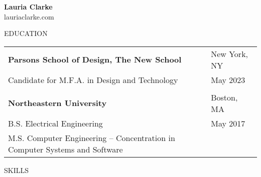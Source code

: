 \documentclass[11pt]{article}
\begin{document}
\thispagestyle{empty}

\begin{center}
  {\LARGE{\bf Lauria Clarke}}
  \vspace{0.25cm} \\
  lauriaclarke.com 
\end{center}

\hrulefill 

EDUCATION

\vspace{0.25cm}
\begin{tabularx}{\textwidth}{l R}
{\bf Parsons School of Design, The New School} & New York, NY\\ 
Candidate for M.F.A. in Design and Technology & May 2023 \\
\\ 
{\bf Northeastern University} & Boston, MA\\ 
B.S. Electrical Engineering & May 2017 \\
M.S. Computer Engineering -- Concentration in Computer Systems and Software\\
\end{tabularx}  
\vspace{-.2cm}

\hrulefill

\vspace{-0.25cm}
SKILLS
\end{document}

